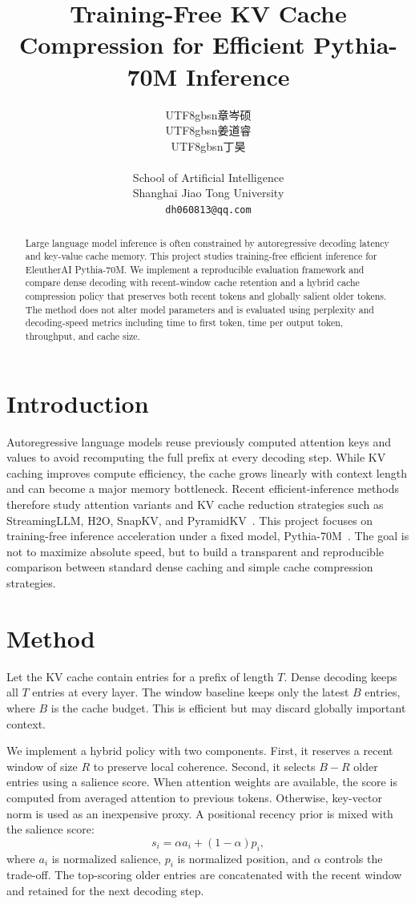 \documentclass{article}
\title{Training-Free KV Cache Compression for Efficient Pythia-70M Inference}
\author{\begin{CJK}{UTF8}{gbsn}章岑硕\end{CJK} \And \begin{CJK}{UTF8}{gbsn}姜道睿\end{CJK} \And \begin{CJK}{UTF8}{gbsn}丁昊\end{CJK} \\
School of Artificial Intelligence \\
Shanghai Jiao Tong University \\
\texttt{dh060813@qq.com}}
\begin{document}
\maketitle

\begin{abstract}
Large language model inference is often constrained by autoregressive decoding latency and key-value cache memory. This project studies training-free efficient inference for EleutherAI Pythia-70M. We implement a reproducible evaluation framework and compare dense decoding with recent-window cache retention and a hybrid cache compression policy that preserves both recent tokens and globally salient older tokens. The method does not alter model parameters and is evaluated using perplexity and decoding-speed metrics including time to first token, time per output token, throughput, and cache size.
\end{abstract}

\section{Introduction}
Autoregressive language models reuse previously computed attention keys and values to avoid recomputing the full prefix at every decoding step. While KV caching improves compute efficiency, the cache grows linearly with context length and can become a major memory bottleneck. Recent efficient-inference methods therefore study attention variants and KV cache reduction strategies such as StreamingLLM, H2O, SnapKV, and PyramidKV~\citep{xiao2023streamingllm,zhang2023h2o,li2024snapkv,cai2024pyramidkv}. This project focuses on training-free inference acceleration under a fixed model, Pythia-70M~\citep{biderman2023pythia}. The goal is not to maximize absolute speed, but to build a transparent and reproducible comparison between standard dense caching and simple cache compression strategies.

\section{Method}
Let the KV cache contain entries for a prefix of length $T$. Dense decoding keeps all $T$ entries at every layer. The window baseline keeps only the latest $B$ entries, where $B$ is the cache budget. This is efficient but may discard globally important context.

We implement a hybrid policy with two components. First, it reserves a recent window of size $R$ to preserve local coherence. Second, it selects $B-R$ older entries using a salience score. When attention weights are available, the score is computed from averaged attention to previous tokens. Otherwise, key-vector norm is used as an inexpensive proxy. A positional recency prior is mixed with the salience score:
\begin{equation}
    s_i = \alpha a_i + (1-\alpha) p_i,
\end{equation}
where $a_i$ is normalized salience, $p_i$ is normalized position, and $\alpha$ controls the trade-off. The top-scoring older entries are concatenated with the recent window and retained for the next decoding step.
\end{document}
